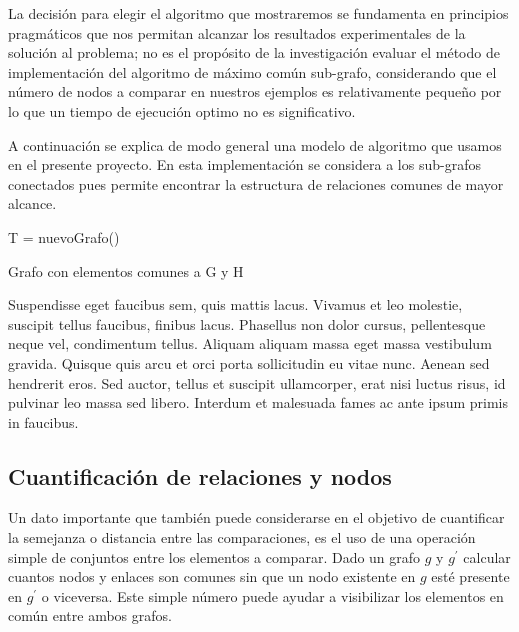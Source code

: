 La decisión para elegir el algoritmo que mostraremos se fundamenta en principios pragmáticos que nos permitan alcanzar los resultados experimentales de la solución al problema; no es el propósito de la investigación evaluar el método de implementación del algoritmo de máximo común sub-grafo, considerando que el número de nodos a comparar en nuestros ejemplos es relativamente pequeño por lo que un tiempo de ejecución optimo no es significativo.

A continuación se explica de modo general una modelo de algoritmo que usamos en el presente proyecto. En esta implementación se considera a los sub-grafos conectados pues permite encontrar la estructura de relaciones comunes de mayor alcance. 


\begin{algorithm}[H]
    T = nuevoGrafo()\;
    \; 
    \caption{Grafo con elementos comunes a G y H}
\end{algorithm}


Suspendisse eget faucibus sem, quis mattis lacus. Vivamus et leo molestie, suscipit tellus faucibus, finibus lacus. Phasellus non dolor cursus, pellentesque neque vel, condimentum tellus. Aliquam aliquam massa eget massa vestibulum gravida. Quisque quis arcu et orci porta sollicitudin eu vitae nunc. Aenean sed hendrerit eros. Sed auctor, tellus et suscipit ullamcorper, erat nisi luctus risus, id pulvinar leo massa sed libero. Interdum et malesuada fames ac ante ipsum primis in faucibus.

\label{def:cuantificacion}

\subsection {Cuantificación de relaciones y nodos}

Un dato importante que también puede considerarse en el objetivo de cuantificar la semejanza o distancia entre las comparaciones, es el uso de una operación simple de conjuntos entre los elementos a comparar. Dado un grafo $g$ y $g^\prime$ calcular cuantos nodos y enlaces son comunes sin que un nodo existente en $g$ esté presente en $g^\prime$ o viceversa. Este simple número puede ayudar a visibilizar los elementos en común entre ambos grafos.
